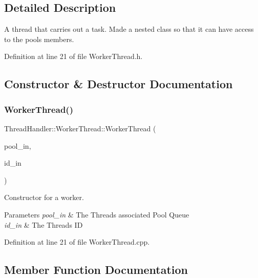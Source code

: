 \subsection{Detailed Description}
A thread that carries out a task. Made a nested class so that it can have access to the pools members. 

Definition at line 21 of file Worker\+Thread.\+h.



\subsection{Constructor \& Destructor Documentation}
\mbox{\label{classThreadHandler_1_1WorkerThread_aaa5da8c1265e775e4bced4526ea70887}} 
\subsubsection{\texorpdfstring{WorkerThread()}{WorkerThread()}}
{\footnotesize\ttfamily Thread\+Handler\+::\+Worker\+Thread\+::\+Worker\+Thread (\begin{DoxyParamCaption}\item[{\mbox{\hyperlink{classThreadHandler_1_1ThreadPool}{Thread\+Pool}} $\ast$}]{pool\+\_\+in,  }\item[{const int}]{id\+\_\+in }\end{DoxyParamCaption})}



Constructor for a worker. 


\begin{DoxyParams}{Parameters}
{\em pool\+\_\+in} & The Threads associated Pool Queue \\
\hline
{\em id\+\_\+in} & The Threads ID \\
\hline
\end{DoxyParams}


Definition at line 21 of file Worker\+Thread.\+cpp.



\subsection{Member Function Documentation}
\mbox{\label{classThreadHandler_1_1WorkerThread_aec4053e02c749fea8f382b9e2c7bf91a}} 
